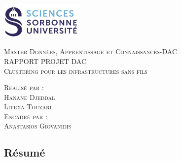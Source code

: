 \documentclass{report}
\begin{document}
\begin{titlepage}
    \begin{flushleft}
    \includegraphics[width=11em]{images/logo.png}\\[1.5cm]
    \end{flushleft}
    \begin{center}
        \textsc{{\LARGE \color{blue} Master Données, Apprentissage et Connaissances-DAC}}\\[5cm]
        \textsc{\huge{RAPPORT PROJET DAC}}\\[1cm]
        \textsc{\vspace{10pt}\Huge{Clustering pour les infrastructures sans fils}}\\[3cm]
        \begin{minipage}{1\textwidth}
            \begin{flushleft} \large
            \textsc{\LARGE{Realisé par :}}\\[0.5cm]
            \textsc{Hanane Djeddal}\\
            \textsc{Liticia Touzari}\\[1.5 cm]
            \textsc{\LARGE{Encadré par :}}\\[0.5cm]
            \textsc{Anastasios Giovanidis}\\
            \end{flushleft}
        \end{minipage}
        \vfill
    \end{center}
  \end{titlepage}

 
  \begin{center}
    \section*{\LARGE{Résumé}}
\end{center}
\end{document}
